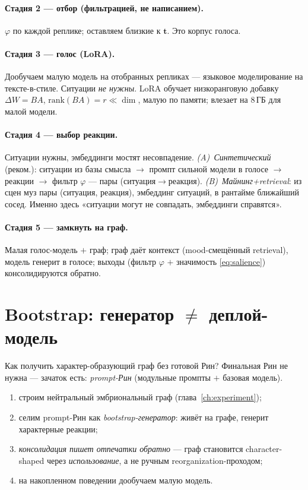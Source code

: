 \paragraph{Стадия 2 — отбор (фильтрацией, не написанием).} $\varphi$ по каждой
реплике; оставляем близкие к $\mathbf{t}$. Это корпус голоса.

\paragraph{Стадия 3 — голос (LoRA).} Дообучаем малую модель на отобранных репликах —
языковое моделирование на тексте-в-стиле. Ситуации \emph{не нужны}. LoRA обучает
низкоранговую добавку $\Delta W=BA$, $\mathrm{rank}(BA)=r\ll\dim$, малую по памяти;
влезает на $8$\,ГБ для малой модели.

\paragraph{Стадия 4 — выбор реакции.} Ситуации нужны, эмбеддинги мостят несовпадение.
\emph{(A)~Синтетический} (реком.): ситуации из базы смысла $\to$ промпт сильной модели
в голосе $\to$ реакции $\to$ фильтр $\varphi$ — пары (ситуация$\to$реакция).
\emph{(B)~Майнинг+retrieval}: из сцен муз пары (ситуация, реакция), эмбеддинг ситуаций,
в рантайме ближайший сосед. Именно здесь «ситуации могут не совпадать, эмбеддинги
справятся».

\paragraph{Стадия 5 — замкнуть на граф.} Малая голос-модель $+$ граф; граф даёт
контекст (mood-смещённый retrieval), модель генерит в голосе; выходы (фильтр $\varphi$
$+$ значимость \eqref{eq:salience}) консолидируются обратно.

\section{Bootstrap: генератор $\ne$ деплой-модель}

Как получить характер-образующий граф без готовой Рин? Финальная Рин не нужна —
зачаток есть: \emph{prompt-Рин} (модульные промпты $+$ базовая модель).

\begin{enumerate}
\item строим нейтральный эмбриональный граф (глава~\ref{ch:experiment});
\item селим prompt-Рин как \emph{bootstrap-генератор}: живёт на графе, генерит
характерные реакции;
\item \emph{консолидация пишет отпечатки обратно} — граф становится character-shaped
через \emph{использование}, а не ручным reorganization-проходом;
\item на накопленном поведении дообучаем малую модель.
\end{enumerate}

